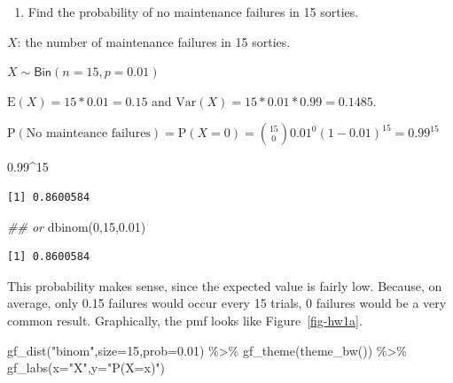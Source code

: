 \documentclass[
  letterpaper,
  DIV=11,
  numbers=noendperiod]{scrreprt}
\newenvironment{Shaded}{\begin{snugshade}}{\end{snugshade}}
\newcommand{\AttributeTok}[1]{\textcolor[rgb]{0.40,0.45,0.13}{#1}}
\newcommand{\DecValTok}[1]{\textcolor[rgb]{0.68,0.00,0.00}{#1}}
\newcommand{\DocumentationTok}[1]{\textcolor[rgb]{0.37,0.37,0.37}{\textit{#1}}}
\newcommand{\FloatTok}[1]{\textcolor[rgb]{0.68,0.00,0.00}{#1}}
\newcommand{\FunctionTok}[1]{\textcolor[rgb]{0.28,0.35,0.67}{#1}}
\newcommand{\NormalTok}[1]{\textcolor[rgb]{0.00,0.23,0.31}{#1}}
\newcommand{\SpecialCharTok}[1]{\textcolor[rgb]{0.37,0.37,0.37}{#1}}
\newcommand{\StringTok}[1]{\textcolor[rgb]{0.13,0.47,0.30}{#1}}
\providecommand{\tightlist}{%
  \setlength{\itemsep}{0pt}\setlength{\parskip}{0pt}}\usepackage{longtable,booktabs,array}
\begin{document}
\begin{enumerate}
\def\labelenumi{\alph{enumi}.}
\tightlist
\item
  Find the probability of no maintenance failures in 15 sorties.
\end{enumerate}

\(X\): the number of maintenance failures in 15 sorties.

\(X\sim \textsf{Bin}(n=15,p=0.01)\)

\(\mbox{E}(X)=15*0.01=0.15\) and \(\mbox{Var}(X)=15*0.01*0.99=0.1485\).

\(\mbox{P}(\mbox{No mainteance failures})=\mbox{P}(X=0)={15\choose 0}0.01^0(1-0.01)^{15}=0.99^{15}\)

\begin{Shaded}
\begin{Highlighting}[]
\FloatTok{0.99}\SpecialCharTok{\^{}}\DecValTok{15}
\end{Highlighting}
\end{Shaded}

\begin{verbatim}
[1] 0.8600584
\end{verbatim}

\begin{Shaded}
\begin{Highlighting}[]
\DocumentationTok{\#\# or }
\FunctionTok{dbinom}\NormalTok{(}\DecValTok{0}\NormalTok{,}\DecValTok{15}\NormalTok{,}\FloatTok{0.01}\NormalTok{)}
\end{Highlighting}
\end{Shaded}

\begin{verbatim}
[1] 0.8600584
\end{verbatim}

This probability makes sense, since the expected value is fairly low.
Because, on average, only 0.15 failures would occur every 15 trials, 0
failures would be a very common result. Graphically, the pmf looks like
Figure~\ref{fig-hw1a}.

\begin{Shaded}
\begin{Highlighting}[]
\FunctionTok{gf\_dist}\NormalTok{(}\StringTok{"binom"}\NormalTok{,}\AttributeTok{size=}\DecValTok{15}\NormalTok{,}\AttributeTok{prob=}\FloatTok{0.01}\NormalTok{) }\SpecialCharTok{\%\textgreater{}\%}
  \FunctionTok{gf\_theme}\NormalTok{(}\FunctionTok{theme\_bw}\NormalTok{()) }\SpecialCharTok{\%\textgreater{}\%}
  \FunctionTok{gf\_labs}\NormalTok{(}\AttributeTok{x=}\StringTok{"X"}\NormalTok{,}\AttributeTok{y=}\StringTok{"P(X=x)"}\NormalTok{)}
\end{Highlighting}
\end{Shaded}
\end{document}
